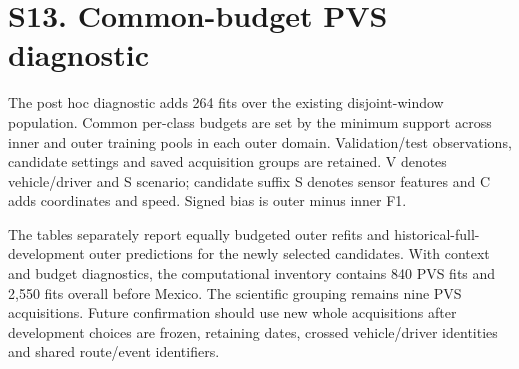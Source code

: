 \section*{S13. Common-budget PVS diagnostic}
The post hoc diagnostic adds 264 fits over the existing disjoint-window population. Common per-class budgets are set by the minimum support across inner and outer training pools in each outer domain. Validation/test observations, candidate settings and saved acquisition groups are retained. V denotes vehicle/driver and S scenario; candidate suffix S denotes sensor features and C adds coordinates and speed. Signed bias is outer minus inner F1.

The tables separately report equally budgeted outer refits and historical-full-development outer predictions for the newly selected candidates. With context and budget diagnostics, the computational inventory contains 840 PVS fits and 2,550 fits overall before Mexico. The scientific grouping remains nine PVS acquisitions. Future confirmation should use new whole acquisitions after development choices are frozen, retaining dates, crossed vehicle/driver identities and shared route/event identifiers.

